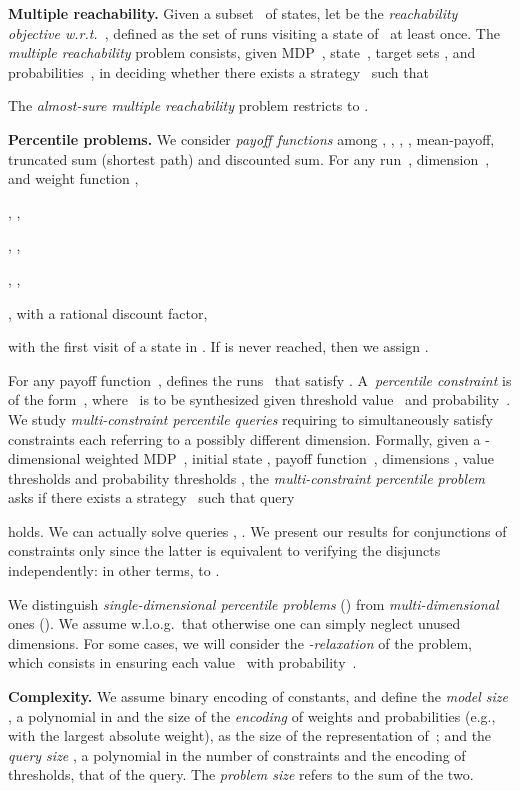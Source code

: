 \documentclass{llncs}
\begin{document}
\smallskip\noindent\textbf{Multiple reachability.} Given a subset~ of states,
let  be the \emph{reachability objective w.r.t.~}, defined as 
the set of runs visiting a state of~ at least once.
The \emph{multiple reachability} problem consists, given MDP~, state~, target sets
, and probabilities~, 
in deciding whether there exists a strategy~
such that

The \emph{almost-sure multiple reachability} problem restricts to .

\label{sec:percentilesProblem}
\smallskip\noindent\textbf{Percentile problems.} 
We consider \textit{payoff functions} among , , ,
, mean-payoff, truncated sum (shortest path) and discounted sum. For
any run~, dimension~, and weight
function ,
\vspace{-1mm}
\begin{itemize*}
\item
  ,
  ,
\item
  ,
  ,
\item 
  ,   ,
\item
  , with  a rational discount factor,
\item 
 with  the first visit of a state in . If  is never reached, then we assign .
\end{itemize*}
\vspace{-1mm}

For any payoff function~,  defines the runs~ that satisfy .
A~\emph{percentile constraint} is of the form~, where~ is to be synthesized given threshold value~ and probability~. We study \emph{multi-constraint percentile queries} requiring to simultaneously satisfy~ constraints each referring to a possibly different dimension.
Formally, given a -dimensional weighted MDP~, initial state , payoff function~,
dimensions , value thresholds  and probability thresholds , the \emph{multi-constraint percentile problem} asks if there exists a strategy~ such that query

	holds. We can actually solve queries
, .
We present our results for conjunctions of constraints only since
the latter is equivalent to verifying the disjuncts independently:
in other terms, to
.

We distinguish \textit{single-dimensional percentile problems} () from
\textit{multi-dimensional} ones ().
We assume w.l.o.g.~that  otherwise one can simply neglect unused dimensions.
For some cases, we will consider the \emph{-relaxation} of the problem,
which consists in ensuring each value~ with probability~.


\smallskip\noindent\textbf{Complexity.} We assume binary encoding of constants,
and define the \emph{model size} , a polynomial in  and the size of the \textit{encoding} of weights and probabilities (e.g.,  with  the largest absolute weight), as the size of the representation of~; and the \emph{query size} , a polynomial in the number of constraints  and the encoding of thresholds, that of the query.
The \emph{problem size} refers to the sum of the two.
\end{document}
